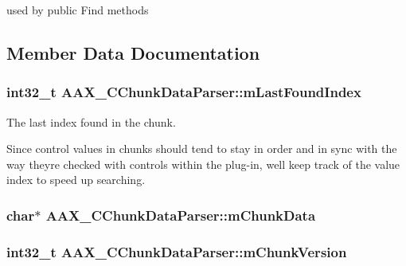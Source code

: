 used by public Find methods 



\subsection{Member Data Documentation}
\hypertarget{a00014_a3e08508e7f92c6e43dd2de6a38868e2f}{}
\subsubsection[{m\+Last\+Found\+Index}]{\setlength{\rightskip}{0pt plus 5cm}int32\+\_\+t A\+A\+X\+\_\+\+C\+Chunk\+Data\+Parser\+::m\+Last\+Found\+Index\hspace{0.3cm}{\ttfamily [protected]}}\label{a00014_a3e08508e7f92c6e43dd2de6a38868e2f}


The last index found in the chunk. 

Since control values in chunks should tend to stay in order and in sync with the way they\textquotesingle{}re checked with controls within the plug-\/in, we\textquotesingle{}ll keep track of the value index to speed up searching. \hypertarget{a00014_a67054cdc2d8e55ff2c26947930784bc9}{}
\subsubsection[{m\+Chunk\+Data}]{\setlength{\rightskip}{0pt plus 5cm}char$\ast$ A\+A\+X\+\_\+\+C\+Chunk\+Data\+Parser\+::m\+Chunk\+Data\hspace{0.3cm}{\ttfamily [protected]}}\label{a00014_a67054cdc2d8e55ff2c26947930784bc9}
\hypertarget{a00014_a5994e0adfb0189cbf5f9a3aa915b3f7d}{}
\subsubsection[{m\+Chunk\+Version}]{\setlength{\rightskip}{0pt plus 5cm}int32\+\_\+t A\+A\+X\+\_\+\+C\+Chunk\+Data\+Parser\+::m\+Chunk\+Version\hspace{0.3cm}{\ttfamily [protected]}}\label{a00014_a5994e0adfb0189cbf5f9a3aa915b3f7d}


